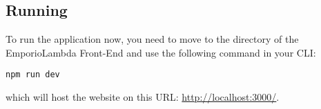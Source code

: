 \subsection{Running}
To run the application now, you need to move to the directory of the EmporioLambda Front-End and use the following command in your CLI:
\begin{center}
\texttt{npm run dev}
\end{center}
which will host the website on this URL: \url{http://localhost:3000/}.